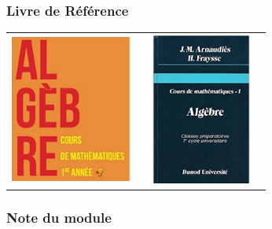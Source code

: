 \documentclass{beamer}
\begin{document}
\begin{frame}[t]
  \frametitle{Livre de Référence}
  \vspace*{1cm}
  \centering
  \begin{tabular}{cc}
    \includegraphics[width=4cm, height=5cm]{./book1.png} &
    \includegraphics[width=4cm, height=5cm]{./book2.png}  
  \end{tabular}
\end{frame}
\begin{frame}[t]
  \frametitle{Note du module}
  \begin{figure}[htpb]
    \centering
  \end{figure} 
\end{frame}
\end{document}
